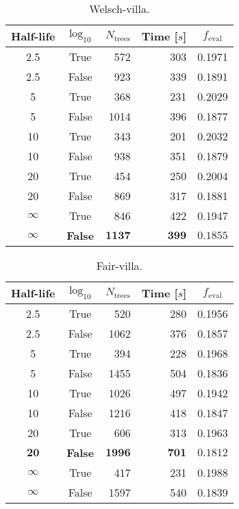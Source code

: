 
\begin{table}[h!]
  \begin{tabular}{@{}ccrrc@{}}
    Half-life & $\log_{10}$ & $N_\mathrm{trees}$ & Time [$s$] & $f_\mathrm{eval}$ \\
    \midrule
    \num{2.5} & True & \num{572} & \num{303} & \num{0.1971} \\
    \num{2.5} & False & \num{923} & \num{339} & \num{0.1891} \\
    \num{5} & True & \num{368} & \num{231} & \num{0.2029} \\
    \num{5} & False & \num{1014} & \num{396} & \num{0.1877} \\
    \num{10} & True & \num{343} & \num{201} & \num{0.2032} \\
    \num{10} & False & \num{938} & \num{351} & \num{0.1879} \\
    \num{20} & True & \num{454} & \num{250} & \num{0.2004} \\
    \num{20} & False & \num{869} & \num{317} & \num{0.1881} \\
    $\infty$ & True & \num{846} & \num{422} & \num{0.1947} \\
    $\bm{\infty}$ & \textbf{False} & $\mathbf{1137}$ & $\mathbf{399}$ & $\mathbf{0.1855}$ \\
  \end{tabular}
  \caption{\label{tab:h:HPO_initial_Welsch-villa}Welsch-villa.}
\end{table}


\begin{table}[h!]
  \begin{tabular}{@{}ccrrc@{}}
    Half-life & $\log_{10}$ & $N_\mathrm{trees}$ & Time [$s$] & $f_\mathrm{eval}$ \\
    \midrule
    \num{2.5} & True & \num{520} & \num{280} & \num{0.1956} \\
    \num{2.5} & False & \num{1062} & \num{376} & \num{0.1857} \\
    \num{5} & True & \num{394} & \num{228} & \num{0.1968} \\
    \num{5} & False & \num{1455} & \num{504} & \num{0.1836} \\
    \num{10} & True & \num{1026} & \num{497} & \num{0.1942} \\
    \num{10} & False & \num{1216} & \num{418} & \num{0.1847} \\
    \num{20} & True & \num{606} & \num{313} & \num{0.1963} \\
    $\mathbf{20}$ & \textbf{False} & $\mathbf{1996}$ & $\mathbf{701}$ & $\mathbf{0.1812}$ \\
    $\infty$ & True & \num{417} & \num{231} & \num{0.1988} \\
    $\infty$ & False & \num{1597} & \num{540} & \num{0.1839} \\
  \end{tabular}
  \caption{\label{tab:h:HPO_initial_Fair-villa}Fair-villa.}
\end{table}
